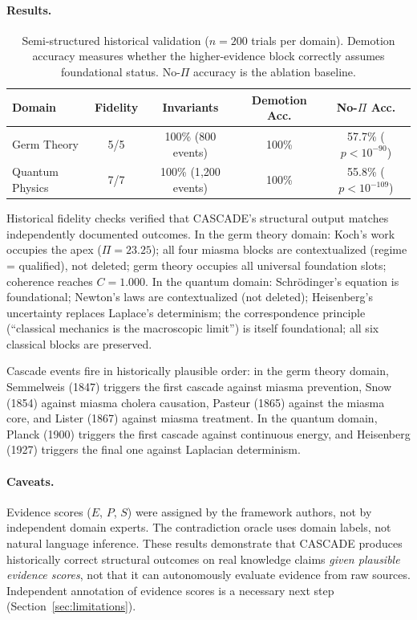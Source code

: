\documentclass[11pt,a4paper]{article}
\theoremstyle{definition}
\newcommand{\tp}{\Pi}
\begin{document}
\paragraph{Results.}

\begin{table}[H]
\centering
\caption{Semi-structured historical validation ($n=200$ trials per domain). Demotion
accuracy measures whether the higher-evidence block correctly assumes foundational
status. No-$\tp$ accuracy is the ablation baseline.}
\label{tab:historical}
\begin{tabular}{@{}lcccc@{}}
\toprule
\textbf{Domain} & \textbf{Fidelity} & \textbf{Invariants} & \textbf{Demotion Acc.} & \textbf{No-$\tp$ Acc.} \\
\midrule
Germ Theory    & 5/5 & 100\% (800 events)   & 100\% & 57.7\% ($p < 10^{-90}$) \\
Quantum Physics & 7/7 & 100\% (1{,}200 events) & 100\% & 55.8\% ($p < 10^{-109}$) \\
\bottomrule
\end{tabular}
\end{table}

Historical fidelity checks verified that CASCADE's structural output matches
independently documented outcomes. In the germ theory domain: Koch's work occupies the
apex ($\tp = 23.25$); all four miasma blocks are contextualized (regime = qualified),
not deleted; germ theory occupies all universal foundation slots; coherence reaches
$C = 1.000$. In the quantum domain: Schr\"{o}dinger's equation is foundational;
Newton's laws are contextualized (not deleted); Heisenberg's uncertainty replaces
Laplace's determinism; the correspondence principle (``classical mechanics is the
macroscopic limit'') is itself foundational; all six classical blocks are preserved.

Cascade events fire in historically plausible order: in the germ theory domain,
Semmelweis (1847) triggers the first cascade against miasma prevention, Snow (1854)
against miasma cholera causation, Pasteur (1865) against the miasma core, and Lister
(1867) against miasma treatment. In the quantum domain, Planck (1900) triggers the
first cascade against continuous energy, and Heisenberg (1927) triggers the final one
against Laplacian determinism.

\paragraph{Caveats.} Evidence scores ($E$, $P$, $S$) were assigned by the framework
authors, not by independent domain experts. The contradiction oracle uses domain
labels, not natural language inference. These results demonstrate that CASCADE produces
historically correct structural outcomes on real knowledge claims \emph{given plausible
evidence scores}, not that it can autonomously evaluate evidence from raw sources.
Independent annotation of evidence scores is a necessary next step
(Section~\ref{sec:limitations}).
\end{document}
